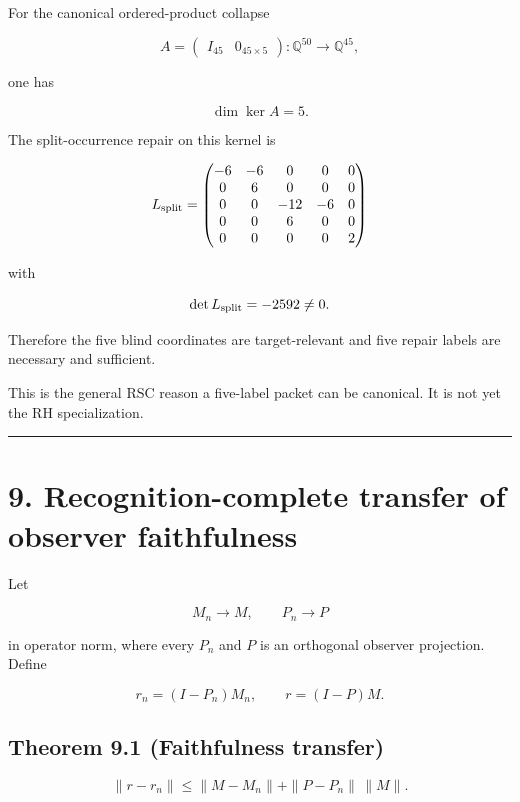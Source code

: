 For the canonical ordered-product collapse

\[
A=\begin{pmatrix}I_{45}&0_{45\times5}\end{pmatrix}:
\mathbb Q^{50}\to\mathbb Q^{45},
\]

one has

\[
\dim\ker A=5.
\]

The split-occurrence repair on this kernel is

\[
L_{\rm split}=
\begin{pmatrix}
-6&-6&0&0&0\\
0&6&0&0&0\\
0&0&-12&-6&0\\
0&0&6&0&0\\
0&0&0&0&2
\end{pmatrix}
\]

with

\[
\det L_{\rm split}=-2592\ne0.
\]

Therefore the five blind coordinates are target-relevant and five repair labels
are necessary and sufficient.

This is the general RSC reason a five-label packet can be canonical. It is not
yet the RH specialization.

\begin{center}\rule{0.5\linewidth}{0.5pt}\end{center}

\hypertarget{recognition-complete-transfer-of-observer-faithfulness}{%
\section{9. Recognition-complete transfer of observer faithfulness}\label{recognition-complete-transfer-of-observer-faithfulness}}

Let

\[
M_n\to M,
\qquad
P_n\to P
\]

in operator norm, where every \(P_n\) and \(P\) is an orthogonal observer
projection. Define

\[
r_n=(I-P_n)M_n,
\qquad
r=(I-P)M.
\]

\hypertarget{theorem-9.1-faithfulness-transfer}{%
\subsection{Theorem 9.1 (Faithfulness transfer)}\label{theorem-9.1-faithfulness-transfer}}

\[
\boxed{
\|r-r_n\|
\le
\|M-M_n\|
+
\|P-P_n\|\,\|M\|.
}
\]

